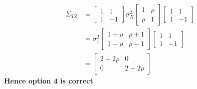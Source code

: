 \documentclass[journal,12pt,twocolumn]{IEEEtran}
\begin{document}
\begin{align*}
    \Sigma_{TZ} &= \begin{bmatrix}
   1   &   1\\
   1   &   -1
\end{bmatrix} \sigma_X^2 
\begin{bmatrix}
   1    & \rho \\
   \rho &  1 
\end{bmatrix}
\begin{bmatrix}
   1   &   1\\
   1   &   -1
\end{bmatrix}\\
&= \sigma_x^2 \begin{bmatrix}
    1 + \rho   &   \rho + 1\\
    1 - \rho   &    \rho - 1
\end{bmatrix} 
\begin{bmatrix}
   1   &   1\\
   1   &   -1
\end{bmatrix} \\&=
\begin{bmatrix}
   2+2\rho    &     0\\
   0         &     2-2\rho
\end{bmatrix}
\end{align*}
\textbf{Hence option 4 is correct}
\end{document}

